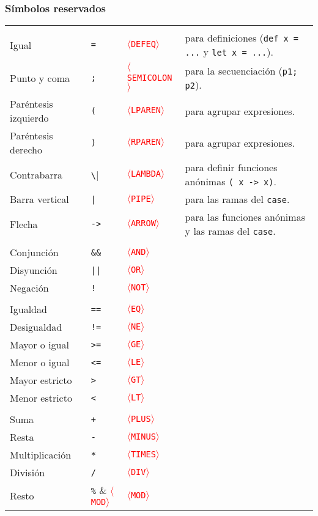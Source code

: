 \documentclass{article}
\newcommand{\tok}[1]{\textcolor{red}{{\texttt{$\langle$#1$\rangle$}}}}
\newcommand{\fl}[1]{\texttt{#1}}
\begin{document}
\subsubsection*{Símbolos reservados}
\begin{center}
\begin{tabular}{lll@{\hspace{1cm}}l}
\hspace{-.5cm}{\bf Delimitadores} \\
{\small Igual} &
\texttt{=} & \tok{DEFEQ}     & {\small para definiciones (\fl{def x = ...} y \fl{let x = ...}).}\\
{\small Punto y coma} &
\texttt{;} & \tok{SEMICOLON} & {\small para la secuenciación (\texttt{p1; p2}).}\\
{\small Paréntesis izquierdo} &
\texttt{(} & \tok{LPAREN} & {\small para agrupar expresiones.}\\
{\small Paréntesis derecho} &
\texttt{)} & \tok{RPAREN} & {\small para agrupar expresiones.}\\
{\small Contrabarra} &
\verb|\| & \tok{LAMBDA} & {\small para definir funciones anónimas \fl{(\ x -> x)}.}\\
{\small Barra vertical} &
\texttt{|} & \tok{PIPE} & {\small para las ramas del \fl{case}.}\\
{\small Flecha} &
\texttt{->} & \tok{ARROW} & {\small para las funciones anónimas y las ramas del \fl{case}.}\\
\hspace{-.5cm}{\bf Operadores lógicos} \\
{\small Conjunción} & \texttt{\&\&} & \tok{AND} \\
{\small Disyunción} & \texttt{||}   & \tok{OR}  \\
{\small Negación}   & \texttt{!}    & \tok{NOT} \\
\hspace{-.5cm}{\bf Operadores relacionales} \\
{\small Igualdad}       & \texttt{==} & \tok{EQ} \\
{\small Desigualdad}    & \texttt{!=} & \tok{NE} \\
{\small Mayor o igual}  & \texttt{>=} & \tok{GE} \\
{\small Menor o igual}  & \texttt{<=} & \tok{LE} \\
{\small Mayor estricto} & \texttt{>}  & \tok{GT} \\
{\small Menor estricto} & \texttt{<}  & \tok{LT} \\
\hspace{-.5cm}{\bf Operadores aritméticos} \\
{\small Suma}           & \texttt{+} & \tok{PLUS} \\
{\small Resta}          & \texttt{-} & \tok{MINUS} \\
{\small Multiplicación} & \texttt{*} & \tok{TIMES} \\
{\small División}       & \texttt{/} & \tok{DIV} \\
{\small Resto}          & \verb|%|   & \tok{MOD} \\
\end{tabular}
\end{center}
\end{document}
